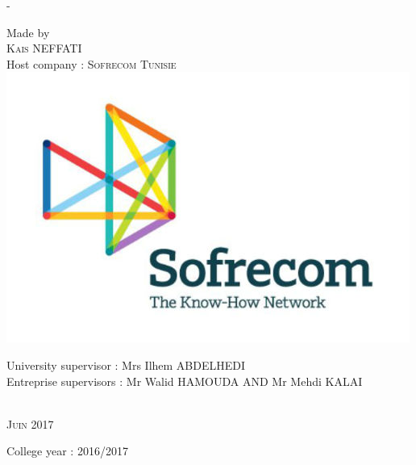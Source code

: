 \begin{titlingpage}
\begin{SingleSpace}
\begin{adjustwidth*}{\unitlength}{-\unitlength}
\begin{center}
\vspace{6.5mm}
{\normalsize Made by}\\
\vspace{5mm}
{\large\textsc{Kais NEFFATI}}\\
\vspace{10mm}
{\large Host company : \textsc{Sofrecom Tunisie}}\\
\vspace{5mm}
\includegraphics[scale=0.2]{logos/logo-sofrecom}\\
\vspace{10mm}
\begin{minipage}{15cm}
\begin{center}
{\small University supervisor : Mrs Ilhem ABDELHEDI  }\\
\vspace{3mm}
{\small Entreprise supervisors : Mr Walid HAMOUDA AND Mr Mehdi KALAI }\\
\end{center}
\end{minipage}\\
\vspace{8mm}
{\large\textsc{Juin 2017}}\\
\vspace{8mm}
\end{center}
\begin{flushright}
{\small College year : 2016/2017}
\end{flushright}
\end{adjustwidth*}
\end{SingleSpace}
\end{titlingpage}